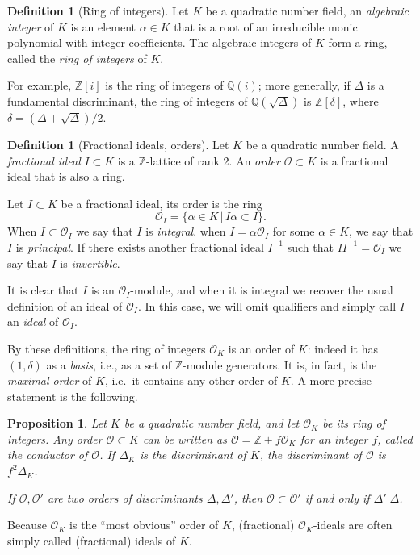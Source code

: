 \documentclass[10pt]{article}
\theoremstyle{plain}
\newtheorem{proposition}[theorem]{Proposition}
\theoremstyle{definition}
\newtheorem{definition}[theorem]{Definition}
\def\O{\ensuremath{\mathcal{O}}}
\begin{document}
\begin{definition}[Ring of integers]
  Let $K$ be a quadratic number field,
  an \emph{algebraic integer} of $K$ is an
  element $α∈K$ that is a root of an irreducible monic polynomial with
  integer coefficients. %
  The algebraic integers of $K$ form a ring, called the \emph{ring of
    integers} of $K$.
\end{definition}

For example, $ℤ[i]$ is the ring of integers of $ℚ(i)$; more generally,
if $Δ$ is a fundamental discriminant, the ring of integers of
$ℚ(\sqrt{Δ})$ is $ℤ[δ]$, where $δ=(Δ+\sqrt{Δ})/2$. %

\begin{definition}[Fractional ideals, orders]
  Let $K$ be a quadratic number field. %
  A \emph{fractional ideal} $I ⊂ K$ is a $ℤ$-lattice of rank 2. %
  An \emph{order} $\O ⊂ K$ is a fractional ideal that is also a ring.

  Let $I ⊂ K$ be a fractional ideal, its order is the ring
  \[\O_I = \{ α ∈ K \,|\, Iα ⊂ I \}.\]
  When $I ⊂ \O_I$ we say that $I$ is \emph{integral}. %
  when $I = α\O_I$ for some $α∈K$, we say that $I$ is
  \emph{principal}. %
  If there exists another fractional ideal $I^{-1}$ such that
  $II^{-1} = \O_I$ we say that $I$ is \emph{invertible}.
\end{definition}  

It is clear that $I$ is an $\O_I$-module, and when it is integral we
recover the usual definition of an ideal of $\O_I$. %
In this case, we will omit qualifiers and simply call $I$ an
\emph{ideal} of $\O_I$. %

By these definitions, the ring of integers $\O_K$ is an order of $K$:
indeed it has $(1,δ)$ as a \emph{basis}, i.e., as a set of $ℤ$-module
generators. %
It is, in fact, is the \emph{maximal order} of $K$, i.e.\ it contains
any other order of $K$. %
A more precise statement is the following.

\begin{proposition}
  Let $K$ be a quadratic number field, and let $\O_K$ be its ring of
  integers. %
  Any order $\O⊂K$ can be written as $\O=ℤ+f\O_K$ for an integer $f$,
  called the \emph{conductor} of $\O$. %
  If $Δ_K$ is the discriminant of $K$, the \emph{discriminant} of $\O$
  is $f^2Δ_K$.

  If $\O,\O'$ are two orders of discriminants $Δ,Δ'$, then $\O⊂\O'$ if
  and only if $Δ'|Δ$.
\end{proposition}

Because $\O_K$ is the ``most obvious'' order of $K$, (fractional)
$\O_K$-ideals are often simply called (fractional) ideals of $K$. %
\end{document}
